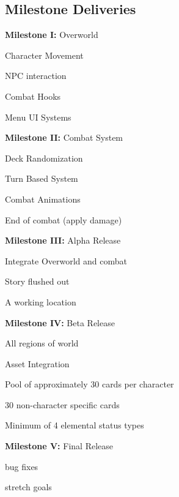\documentclass[12pt,titlepage]{article}
\begin{document}
\subsection{Milestone Deliveries}
\begin{todolist}
    \item \textbf{Milestone I:} Overworld
        \begin{todolist}
            \item Character Movement
            \item NPC interaction
            \item Combat Hooks
            \item Menu UI Systems
        \end{todolist}

    \item \textbf{Milestone II:} Combat System
        \begin{todolist}
            \item Deck Randomization
            \item Turn Based System
            \item Combat Animations
            \item End of combat (apply damage)
        \end{todolist}

    \item \textbf{Milestone III:} Alpha Release
        \begin{todolist}
            \item Integrate Overworld and combat
            \item Story flushed out
            \item A working location
        \end{todolist}

    \item \textbf{Milestone IV:} Beta Release
        \begin{todolist}
            \item All regions of world
            \item Asset Integration
            \item Pool of approximately 30 cards per character
            \item 30 non-character specific cards
            \item Minimum of 4 elemental status types
        \end{todolist}

    \item \textbf{Milestone V:} Final Release
        \begin{todolist}
            \item bug fixes
            \item stretch goals
        \end{todolist}
\end{todolist}
\end{document}
